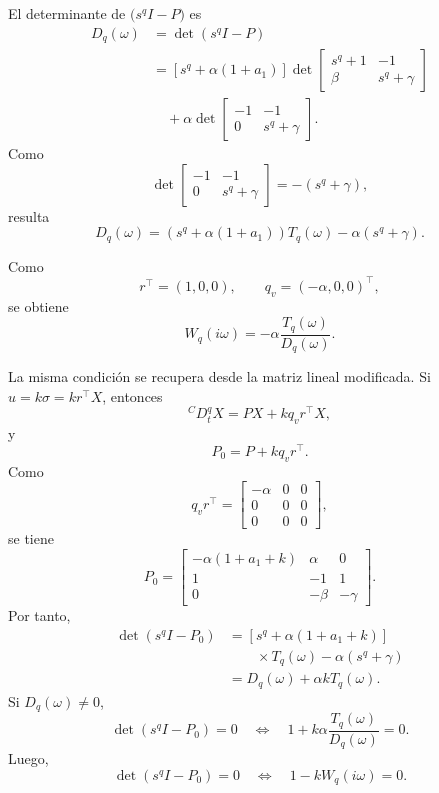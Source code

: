 \documentclass[journal]{IEEEtran}
\begin{document}
El determinante de \(\bigl(s^q I-P\bigr)\) es
\begin{align}
D_q(\omega)
&=
\det\left(s^q I-P\right) \nonumber\\
&=
\left[s^q+\alpha(1+a_1)\right]
\det
\begin{bmatrix}
s^q+1&-1\\
\beta&s^q+\gamma
\end{bmatrix}
\nonumber\\
&\quad+
\alpha
\det
\begin{bmatrix}
-1&-1\\
0&s^q+\gamma
\end{bmatrix}.
\end{align}
Como
\[
\det
\begin{bmatrix}
-1&-1\\
0&s^q+\gamma
\end{bmatrix}
=
-\left(s^q+\gamma\right),
\]
resulta
\begin{equation}
\label{eq:D_arctan}
D_q(\omega)
=
\left(s^q+\alpha(1+a_1)\right)T_q(\omega)
-\alpha\left(s^q+\gamma\right).
\end{equation}

Como
\[
r^\top=(1,0,0),
\qquad
q_v=(-\alpha,0,0)^\top,
\]
se obtiene
\begin{equation}
\label{eq:W_explicit_arctan}
W_q(i\omega)
=
-\alpha\frac{T_q(\omega)}{D_q(\omega)}.
\end{equation}

La misma condición se recupera desde la matriz lineal modificada. Si
\(u=k\sigma=kr^\top X\), entonces
\[
{}^CD_t^qX
=
PX+kq_vr^\top X,
\]
y
\begin{equation}
P_0=P+kq_vr^\top.
\end{equation}
Como
\[
q_vr^\top
=
\begin{bmatrix}
-\alpha&0&0\\
0&0&0\\
0&0&0
\end{bmatrix},
\]
se tiene
\[
P_0=
\begin{bmatrix}
-\alpha(1+a_1+k)&\alpha&0\\
1&-1&1\\
0&-\beta&-\gamma
\end{bmatrix}.
\]
Por tanto,
\begin{align}
\det\left(s^q I-P_0\right)
&=
\left[s^q+\alpha(1+a_1+k)\right] \\
&\qquad\times T_q(\omega)-\alpha\left(s^q+\gamma\right) \nonumber\\
&=
D_q(\omega)+\alpha kT_q(\omega).
\end{align}
Si \(D_q(\omega)\neq0\),
\[
\det\left(s^q I-P_0\right)=0
\quad\Longleftrightarrow\quad
1+k\alpha\frac{T_q(\omega)}{D_q(\omega)}=0.
\]
Luego,
\[
\det\left(s^q I-P_0\right)=0
\quad\Longleftrightarrow\quad
1-kW_q(i\omega)=0.
\]
\end{document}
